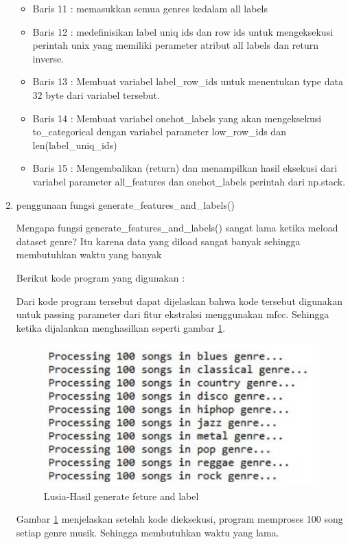 \begin{enumerate}
\begin{itemize}
	\item Baris 11 : memasukkan semua genres kedalam all labels
	\item Baris 12 : medefinisikan label uniq ids dan row ids untuk mengeksekusi perintah unix yang memiliki perameter atribut all labels dan return inverse.
	\item Baris 13 : Membuat variabel label\_row\_ids untuk menentukan type data 32 byte dari variabel tersebut.
	\item Baris 14 : Membuat variabel onehot\_labels yang akan mengeksekusi to\_categorical dengan variabel parameter low\_row\_ids dan len(label\_uniq\_ids)
	\item Baris 15 : Mengembalikan (return) dan menampilkan hasil eksekusi dari variabel parameter all\_features dan onehot\_labels perintah dari np.stack.
	\end{itemize}

\item penggunaan fungsi generate\_features\_and\_labels()
	\par Mengapa fungsi generate\_features\_and\_labels() sangat lama ketika meload dataset genre? Itu karena data yang diload sangat banyak sehingga membutuhkan waktu yang banyak
	\par Berikut kode program yang digunakan :
	
	\par Dari kode program tersebut dapat dijelaskan bahwa kode tersebut digunakan untuk passing parameter dari fitur ekstraksi menggunakan mfcc. Sehingga ketika dijalankan menghasilkan seperti gambar \ref{6B6}.
		\begin{figure}[!hbtp]
		\centering
		\includegraphics[scale=0.4]{figures/t5.jpg}
		\caption{Lusia-Hasil generate feture and label}
		\label{6B6}
		\end{figure}
	\par Gambar \ref{6B6} menjelaskan setelah kode dieksekusi, program memproses 100 song setiap genre musik. Sehingga membutuhkan waktu yang lama.


\end{enumerate}
